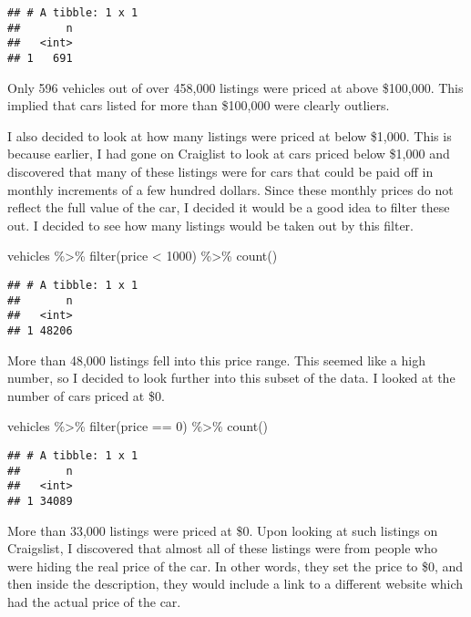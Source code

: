 \documentclass[
]{article}
\newenvironment{Shaded}{\begin{snugshade}}{\end{snugshade}}
\newcommand{\DecValTok}[1]{\textcolor[rgb]{0.00,0.00,0.81}{#1}}
\newcommand{\FunctionTok}[1]{\textcolor[rgb]{0.00,0.00,0.00}{#1}}
\newcommand{\NormalTok}[1]{#1}
\newcommand{\SpecialCharTok}[1]{\textcolor[rgb]{0.00,0.00,0.00}{#1}}
\begin{document}
\begin{verbatim}
## # A tibble: 1 x 1
##       n
##   <int>
## 1   691
\end{verbatim}

Only 596 vehicles out of over 458,000 listings were priced at above
\$100,000. This implied that cars listed for more than \$100,000 were
clearly outliers.

I also decided to look at how many listings were priced at below
\$1,000. This is because earlier, I had gone on Craiglist to look at
cars priced below \$1,000 and discovered that many of these listings
were for cars that could be paid off in monthly increments of a few
hundred dollars. Since these monthly prices do not reflect the full
value of the car, I decided it would be a good idea to filter these out.
I decided to see how many listings would be taken out by this filter.

\begin{Shaded}
\begin{Highlighting}[]
\NormalTok{vehicles }\SpecialCharTok{\%\textgreater{}\%} 
  \FunctionTok{filter}\NormalTok{(price }\SpecialCharTok{\textless{}} \DecValTok{1000}\NormalTok{) }\SpecialCharTok{\%\textgreater{}\%} 
  \FunctionTok{count}\NormalTok{()}
\end{Highlighting}
\end{Shaded}

\begin{verbatim}
## # A tibble: 1 x 1
##       n
##   <int>
## 1 48206
\end{verbatim}

More than 48,000 listings fell into this price range. This seemed like a
high number, so I decided to look further into this subset of the data.
I looked at the number of cars priced at \$0.

\begin{Shaded}
\begin{Highlighting}[]
\NormalTok{vehicles }\SpecialCharTok{\%\textgreater{}\%} 
  \FunctionTok{filter}\NormalTok{(price }\SpecialCharTok{==} \DecValTok{0}\NormalTok{) }\SpecialCharTok{\%\textgreater{}\%} 
  \FunctionTok{count}\NormalTok{()}
\end{Highlighting}
\end{Shaded}

\begin{verbatim}
## # A tibble: 1 x 1
##       n
##   <int>
## 1 34089
\end{verbatim}

More than 33,000 listings were priced at \$0. Upon looking at such
listings on Craigslist, I discovered that almost all of these listings
were from people who were hiding the real price of the car. In other
words, they set the price to \$0, and then inside the description, they
would include a link to a different website which had the actual price
of the car.
\end{document}
